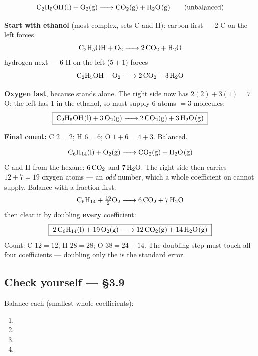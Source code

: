 \documentclass{apchem-worksheet}
\begin{document}
\begin{workedexample}
\[ \ce{C2H5OH(l) + O2(g) -> CO2(g) + H2O(g)} \qquad \text{(unbalanced)} \]

\textbf{Start with ethanol} (most complex, sets C and H):
carbon first --- 2 C on the left forces
\[ \ce{C2H5OH + O2 -> 2CO2 + H2O} \]
hydrogen next --- 6 H on the left ($5+1$) forces
\[ \ce{C2H5OH + O2 -> 2CO2 + 3H2O} \]

\textbf{Oxygen last}, because  stands alone. The right side now has
$2(2) + 3(1) = 7$ O; the left has 1 in the ethanol, so  must supply
6 atoms $= 3$ molecules:
\[ \boxed{\;\ce{C2H5OH(l) + 3O2(g) -> 2CO2(g) + 3H2O(g)}\;} \]

\textbf{Final count:} C $2 = 2$; H $6 = 6$; O $1 + 6 = 4 + 3$. Balanced.
\end{workedexample}

\begin{workedexample}
\[ \ce{C6H14(l) + O2(g) -> CO2(g) + H2O(g)} \]
C and H from the hexane: $6\,\ce{CO2}$ and $7\,\ce{H2O}$. The right side
then carries $12 + 7 = 19$ oxygen atoms --- an \emph{odd} number, which a
whole coefficient on  cannot supply. Balance with a fraction first:
\[ \ce{C6H14 + \tfrac{19}{2}O2 -> 6CO2 + 7H2O} \]
then clear it by doubling \textbf{every} coefficient:
\[ \boxed{\;\ce{2C6H14(l) + 19O2(g) -> 12CO2(g) + 14H2O(g)}\;} \]
Count: C $12 = 12$; H $28 = 28$; O $38 = 24 + 14$. The doubling step must
touch all four coefficients --- doubling only the  is the standard
error.
\end{workedexample}

\subsection*{\sffamily Check yourself --- \S3.9}

Balance each (smallest whole coefficients):

\begin{enumerate}[leftmargin=*,itemsep=0.4em]
  \item {}
  \item {}
  \item {}
  \item {}
\end{enumerate}
\end{document}
